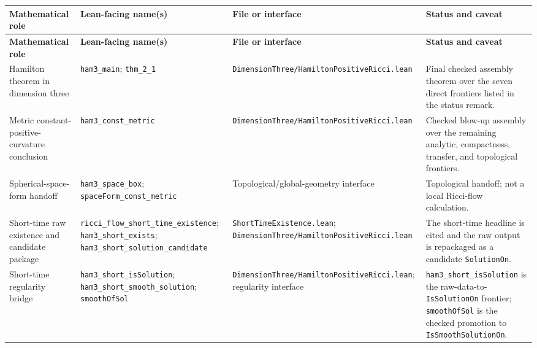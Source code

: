 \documentclass[11pt]{article}
\theoremstyle{plain}
\theoremstyle{definition}
\theoremstyle{remark}
\newcommand{\leanref}[1]{\nolinkurl{#1}}
\newcommand{\leanfile}[1]{\nolinkurl{#1}}
\newcommand{\rffile}[1]{\leanfile{#1}}
\begin{document}
{\footnotesize
\setlength{\LTpre}{0.5em}
\setlength{\LTpost}{0.5em}
\renewcommand{\arraystretch}{1.12}
\begin{longtable}{@{}>{\raggedright\arraybackslash}p{}@{\hspace{0.35em}}>{\raggedright\arraybackslash}p{}@{\hspace{0.35em}}>{\raggedright\arraybackslash}p{}@{\hspace{0.35em}}>{\raggedright\arraybackslash}p{}@{}}
\textbf{Mathematical role} & \textbf{Lean-facing name(s)} & \textbf{File or interface} & \textbf{Status and caveat} \\
\hline
\endfirsthead
\textbf{Mathematical role} & \textbf{Lean-facing name(s)} & \textbf{File or interface} & \textbf{Status and caveat} \\
\hline
\endhead

Hamilton theorem in dimension three &
\leanref{ham3_main}; \leanref{thm_2_1} &
\rffile{DimensionThree/HamiltonPositiveRicci.lean} &
Final checked assembly theorem over the seven direct frontiers listed in the status remark. \\

Metric constant-positive-curvature conclusion &
\leanref{ham3_const_metric} &
\rffile{DimensionThree/HamiltonPositiveRicci.lean} &
Checked blow-up assembly over the remaining analytic, compactness, transfer, and topological frontiers. \\

Spherical-space-form handoff &
\leanref{ham3_space_box}; \leanref{spaceForm_const_metric} &
Topological/global-geometry interface &
Topological handoff; not a local Ricci-flow calculation. \\

Short-time raw existence and candidate package &
\leanref{ricci_flow_short_time_existence}; \leanref{ham3_short_exists}; \leanref{ham3_short_solution_candidate} &
\rffile{ShortTimeExistence.lean}; \rffile{DimensionThree/HamiltonPositiveRicci.lean} &
The short-time headline is cited and the raw output is repackaged as a candidate \leanref{SolutionOn}. \\

Short-time regularity bridge &
\leanref{ham3_short_isSolution}; \leanref{ham3_short_smooth_solution}; \leanref{smoothOfSol} &
\rffile{DimensionThree/HamiltonPositiveRicci.lean}; regularity interface &
\leanref{ham3_short_isSolution} is the raw-data-to-\leanref{IsSolutionOn} frontier; \leanref{smoothOfSol} is the checked promotion to \leanref{IsSmoothSolutionOn}. \\


\end{longtable}}
\end{document}
